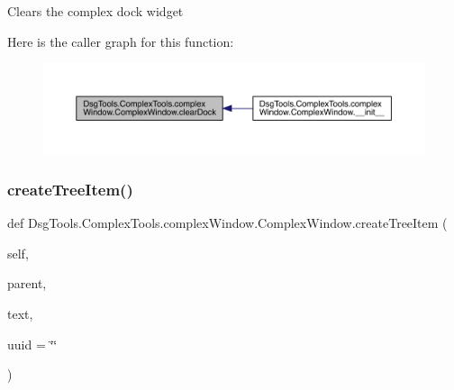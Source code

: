 \begin{DoxyVerb}Clears the complex dock widget
\end{DoxyVerb}
 Here is the caller graph for this function\+:
\nopagebreak
\begin{figure}[H]
\begin{center}
\leavevmode
\includegraphics[width=350pt]{class_dsg_tools_1_1_complex_tools_1_1complex_window_1_1_complex_window_a32017933c586a405679d74c6e822132d_icgraph}
\end{center}
\end{figure}
\mbox{\label{class_dsg_tools_1_1_complex_tools_1_1complex_window_1_1_complex_window_a3404a1ab1ce3eeb54abf660981d37ba7}} 
\subsubsection{\texorpdfstring{create\+Tree\+Item()}{createTreeItem()}}
{\footnotesize\ttfamily def Dsg\+Tools.\+Complex\+Tools.\+complex\+Window.\+Complex\+Window.\+create\+Tree\+Item (\begin{DoxyParamCaption}\item[{}]{self,  }\item[{}]{parent,  }\item[{}]{text,  }\item[{}]{uuid = {\ttfamily \char`\"{}\char`\"{}} }\end{DoxyParamCaption})}

